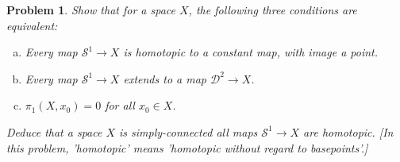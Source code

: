 \documentclass[11pt, a4paper, final]{amsart}
\newcommand{\sphere}{\mathcal{S}}
\newcommand{\disk}{\mathcal{D}}
\numberwithin{theorem}{section}
\newtheorem{problem}[theorem]{Problem}
\theoremstyle{definition}
\theoremstyle{remark}
\begin{document}
\begin{problem}\label{problem: 1.1.5.}
    Show that for a space \(X\), the following three conditions are equivalent:
    \begin{enumerate}[(a)]
        \item Every map \( \sphere^1 \longrightarrow X\) is homotopic to a constant map, with image a point.
        \item Every map \(\sphere^1 \longrightarrow X\) extends to a map \(\disk^2 \longrightarrow X\).
        \item \( \pi_1(X, x_0) = 0 \) for all \( x_0 \in X\).
    \end{enumerate}
    Deduce that a space \(X\) is simply-connected all maps \(\sphere^1 \longrightarrow X\) are homotopic. [In this problem, 'homotopic' means 'homotopic without regard to basepoints'.]
\end{problem}
\end{document}
